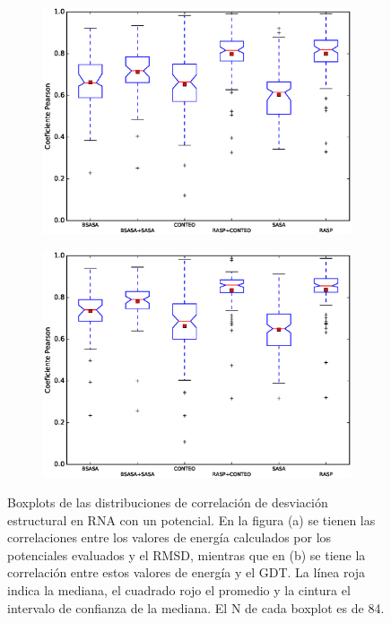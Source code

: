 \begin{figure}[tp]
  \centering  
  \begin{subfigure}{.8\linewidth}
    \centering
    \includegraphics[width=\linewidth]{figures/resultados/rna/struct/boxplot_rmsd.eps}
    \caption{}
  \end{subfigure}
  \begin{subfigure}{.8\linewidth}
    \centering
    \includegraphics[width=\linewidth]{figures/resultados/rna/struct/boxplot_gdt.eps}
    \caption{}
  \end{subfigure}
 
\caption[Boxplots de las distribuciones de correlación de desviación estructural en RNA con un potencial.]{Boxplots de las distribuciones de correlación de desviación estructural en RNA con un potencial. En la figura (a) se tienen las correlaciones entre los valores de energía calculados por los potenciales evaluados y el RMSD, mientras que en (b) se tiene la correlación entre estos valores de energía y el GDT. La línea roja indica la mediana, el cuadrado rojo el promedio y la cintura el intervalo de confianza de la mediana. El N de cada boxplot es de 84.}
\label{fig:cap2011}
\end{figure}

